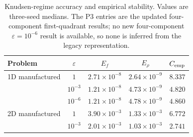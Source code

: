 \begin{table}[t]
\centering
\caption{Knudsen-regime accuracy and empirical stability. Values are three-seed medians. The P3 entries are the updated four-component first-quadrant results; no new four-component $\varepsilon=10^{-6}$ result is available, so none is inferred from the legacy representation.}
\label{tab:knudsen-accuracy}
\begin{tabular}{lcccc}
\toprule
Problem & $\varepsilon$ & $E_f$ & $E_\rho$ & $C_{\rm emp}$\\
\midrule
1D manufactured & $1$ & $2.71\times10^{-8}$ & $2.64\times10^{-9}$ & $8.337$\\
 & $10^{-3}$ & $1.21\times10^{-8}$ & $4.73\times10^{-9}$ & $4.820$\\
 & $10^{-6}$ & $1.21\times10^{-8}$ & $4.78\times10^{-9}$ & $4.860$\\
\midrule
2D manufactured & $1$ & $3.90\times10^{-3}$ & $1.33\times10^{-3}$ & $6.772$\\
 & $10^{-3}$ & $2.01\times10^{-3}$ & $1.03\times10^{-3}$ & $2.741$\\
\bottomrule
\end{tabular}
\end{table}

